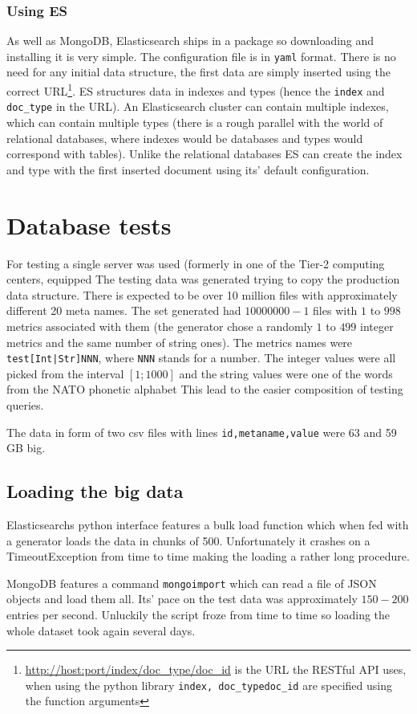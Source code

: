 \subsubsection{Using ES}

As well as MongoDB, Elasticsearch ships in a package so downloading and installing it is very simple. The 
configuration file is in \texttt{yaml} format. There is no need for any initial data structure,
the first data are simply inserted using the correct URL\footnote{\url{http://host:port/index/doc_type/doc_id}
is the URL the RESTful API uses, when using the python library \texttt{index, doc\_type}\texttt{doc\_id} are 
specified using the function arguments}. ES structures data in indexes and types (hence the \texttt{index} and
\texttt{doc\_type} in the URL). An Elasticsearch cluster can contain multiple indexes, which can contain multiple
types (there is a rough parallel with the world of relational databases, where indexes would be databases and
types would correspond with tables). Unlike the relational databases ES can create the index and type with the 
first inserted document using its' default configuration.

\section{Database tests}

For testing a single server was used (formerly in one of the Tier-2 computing centers, equipped
The testing data was generated trying to copy the production data structure. There is expected to
be over 10 million files with approximately different 20 meta names. %
The set generated had $10 000 000 - 1$ files with $1$ to $998$ metrics associated with them 
(the generator chose a randomly $1$ to $499$ integer metrics and the same number of string ones).
The metrics names were \texttt{test[Int|Str]NNN}, where \texttt{NNN} stands for a number. The
integer values were all picked from the interval $[1;1000]$ and the string values were one of the
words from the NATO phonetic alphabet %
This lead to the easier composition of testing queries.

The data in form of two csv files with lines \texttt{id,metaname,value} were 63 and 59 GB big.

\subsection{Loading the big data}

Elasticsearchs python interface features a bulk load function which when fed with a generator
loads the data in chunks of 500. Unfortunately it crashes on a TimeoutException from time to 
time making the loading a rather long procedure. 

MongoDB features a command \texttt{mongoimport} which can read a file of JSON objects and load
them all. Its' pace on the test data was approximately $150-200$ entries per second. Unluckily 
the script froze from time to time so loading the whole dataset took again several days.
